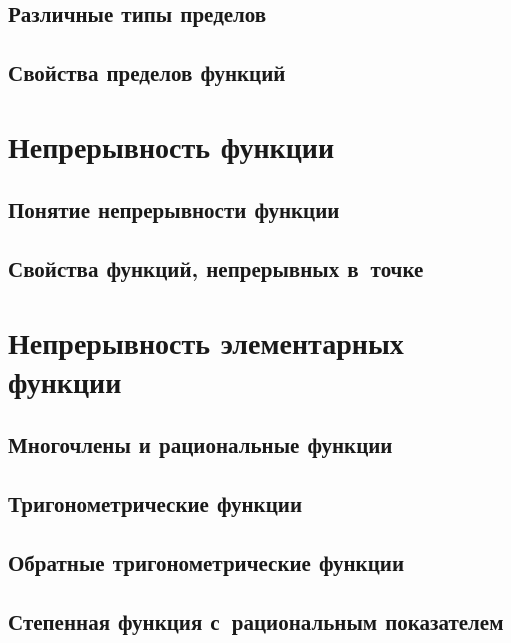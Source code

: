 \documentclass[14pt, oneside]{extbook}
\begin{document}
\subsection{Различные типы пределов}

\subsection{Свойства пределов функций}\label{sec:4_1_4}

\section{Непрерывность функции}
\subsection{Понятие непрерывности функции}

\subsection{Свойства функций, непрерывных в~точке}

\section{Непрерывность элементарных функции}
\subsection{Многочлены и рациональные функции}

\subsection{Тригонометрические функции}\label{sec:4_3_2}

\subsection{Обратные тригонометрические функции}

\subsection{Степенная функция с~рациональным показателем}

\end{document}
